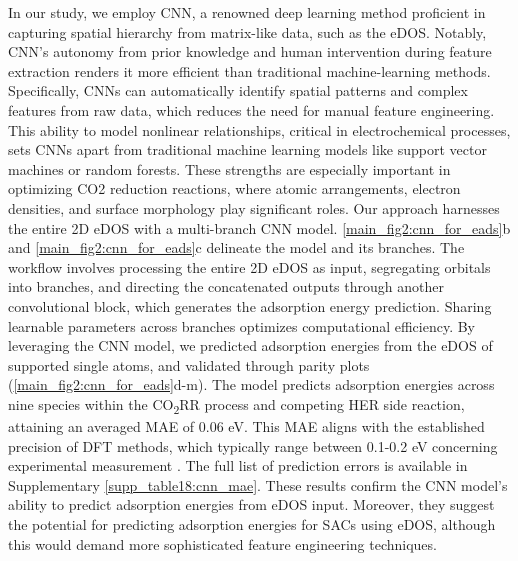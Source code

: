     In our study, we employ CNN, a renowned deep learning method proficient in capturing spatial hierarchy from matrix-like data, such as the eDOS.
    Notably, CNN's autonomy from prior knowledge and human intervention during feature extraction renders it more efficient than traditional machine-learning methods.
    Specifically, CNNs can automatically identify spatial patterns and complex features from raw data, which reduces the need for manual feature engineering.
    This ability to model nonlinear relationships, critical in electrochemical processes, sets CNNs apart from traditional machine learning models like support vector machines or random forests.
    These strengths are especially important in optimizing CO2 reduction reactions, where atomic arrangements, electron densities, and surface morphology play significant roles.
    Our approach harnesses the entire 2D eDOS with a multi-branch CNN model.
    \cref{main_fig2:cnn_for_eads}b and \cref{main_fig2:cnn_for_eads}c delineate the model and its branches.
    The workflow involves processing the entire 2D eDOS as input, segregating orbitals into branches, and directing the concatenated outputs through another convolutional block, which generates the adsorption energy prediction.
    Sharing learnable parameters across branches optimizes computational efficiency.
    By leveraging the CNN model, we predicted adsorption energies from the eDOS of supported single atoms, and validated through parity plots (\cref{main_fig2:cnn_for_eads}d-m).
    The model predicts adsorption energies across nine species within the CO\textsubscript{2}RR process and competing HER side reaction, attaining an averaged MAE of 0.06 eV.
    This MAE aligns with the established precision of DFT methods, which typically range between 0.1-0.2 eV concerning experimental measurement \cite{wellendorff2015benchmark, kirklin2015open, lejaeghere2016reproducibility}.
    The full list of prediction errors is available in Supplementary \cref{supp_table18:cnn_mae}.
    These results confirm the CNN model's ability to predict adsorption energies from eDOS input.
    Moreover, they suggest the potential for predicting adsorption energies for SACs using eDOS, although this would demand more sophisticated feature engineering techniques.

